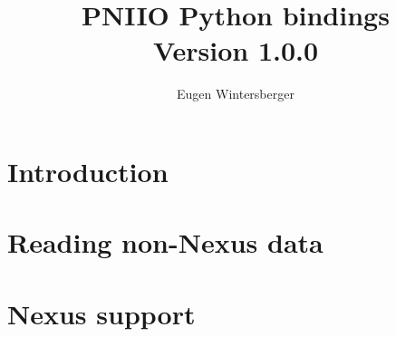 \documentclass{scrbook}
\title{{\Huge PNIIO Python bindings}\\
       Version 1.0.0}
\author{Eugen Wintersberger}
\begin{document}
\maketitle
\tableofcontents

\chapter{Introduction}

\chapter{Reading non-Nexus data}

\chapter{Nexus support}
\end{document}
